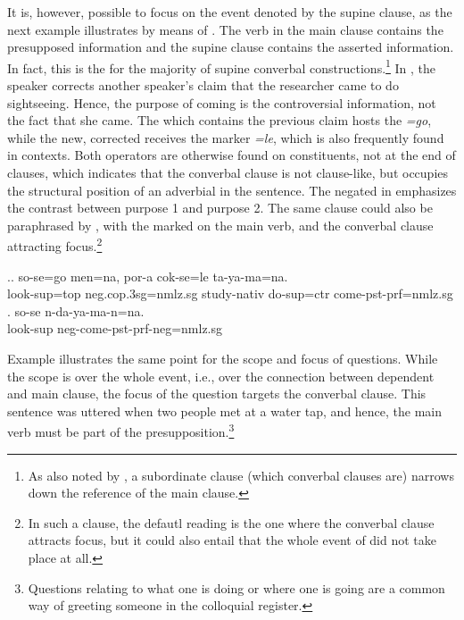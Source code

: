 It is, however, possible to focus on the event denoted by the supine clause, as the next example illustrates by means of . The  verb in the main clause contains the presupposed information and the supine clause contains the asserted information. In fact, this is the  for the majority of supine converbal constructions.\footnote{As also noted by \citet[12--7]{Haspelmath1995The-converb}, a subordinate clause (which converbal clauses are) narrows down the reference of the main clause.} In \Next[a], the speaker corrects another speaker's claim that the researcher came to do sightseeing. Hence, the purpose of coming is the controversial information, not the fact that she came. The  which contains the previous claim hosts the  \emph{=go}, while the new, corrected   receives the  marker \emph{=le}, which is also frequently found in  contexts. Both operators are otherwise found on constituents, not at the end of clauses, which indicates that the converbal clause is not clause-like, but occupies the structural position of an adverbial in the sentence. The negated  in \Next[a] emphasizes the contrast between purpose 1 and purpose 2. The same clause could also be paraphrased by \Next[b], with the  marked on the main verb, and the converbal clause attracting focus.\footnote{In such a clause, the defautl reading is the one where the converbal clause attracts focus, but it could also entail that the whole event of  did not take place at all.} 
 	
\ex.\ag. so-se=go   men=na,     por-a         cok-se=le ta-ya-ma=na.\\
look{\sc -sup=top} {\sc neg.cop.3sg=nmlz.sg} study{\sc -nativ} do{\sc -sup=ctr} come{\sc [3sg]-pst-prf=nmlz.sg}\\
\bg. so-se n-da-ya-ma-n=na.\\
look{\sc -sup} {\sc neg-}come{\sc [3sg]-pst-prf-neg=nmlz.sg}\\

Example \Next illustrates the same point for the scope and focus of questions. While the scope is over the whole event, i.e., over the connection between dependent and main clause, the focus of the question targets the converbal clause. This sentence was uttered when two people met at a water tap, and hence, the main verb  must be part of the presupposition.\footnote{Questions relating to what one is doing or where one is going are a common way of greeting someone in the colloquial register.}

